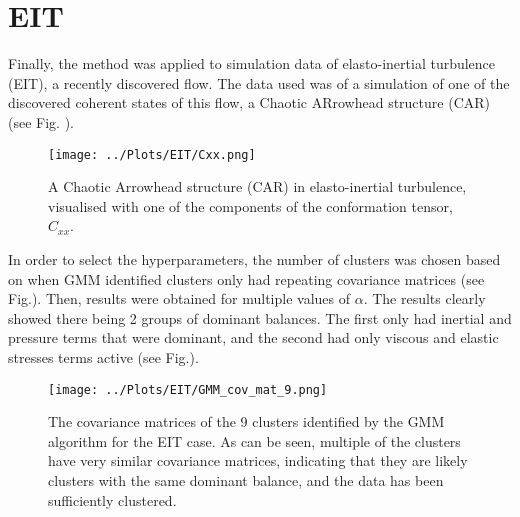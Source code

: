 \documentclass[12pt]{report} %
\begin{document}
\section{EIT}

Finally, the method was applied to simulation data of elasto-inertial turbulence (EIT), a recently discovered flow\cite{Samanta2012eit}. The data used was of a simulation of one of the discovered coherent states of this flow\cite{beneitez2024multistability}, a Chaotic ARrowhead structure (CAR) (see Fig. ).

\begin{figure}[h]
  \centering
  \texttt{[image: ../Plots/EIT/Cxx.png]}
  \caption{A Chaotic Arrowhead structure (CAR) in elasto-inertial turbulence, visualised with one of the components of the conformation tensor, $C_{xx}$.}
  \label{fig:CAR}
\end{figure}

In order to select the hyperparameters, the number of clusters was chosen based on when GMM identified clusters only had repeating covariance matrices (see Fig.). Then, results were obtained for multiple values of $\alpha$. The results clearly showed there being 2 groups of dominant balances. The first only had inertial and pressure terms that were dominant, and the second had only viscous and elastic stresses terms active (see Fig.).

\begin{figure}[h]
  \centering
  \texttt{[image: ../Plots/EIT/GMM\_cov\_mat\_9.png]}
  \caption{The covariance matrices of the 9 clusters identified by the GMM algorithm for the EIT case. As can be seen, multiple of the clusters have very similar covariance matrices, indicating that they are likely clusters with the same dominant balance, and the data has been sufficiently clustered.}
  \label{fig:Cov_Mat_EIT}
\end{figure}












\end{document}
